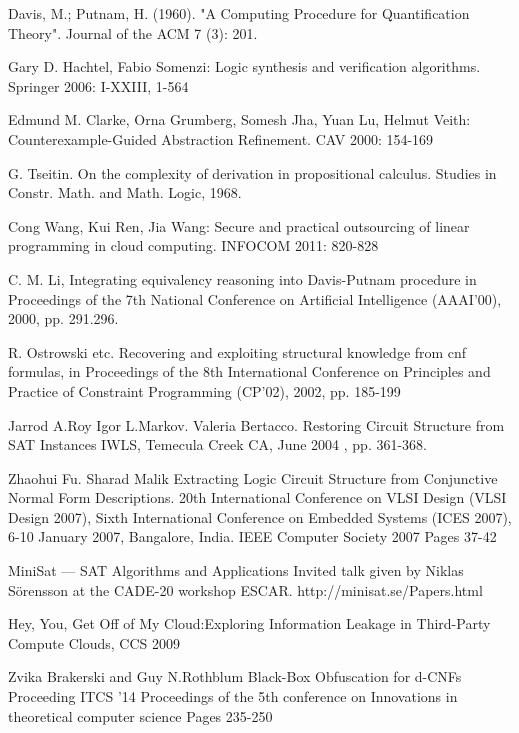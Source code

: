 \documentclass[runningheads,a4paper]{llncs}
\begin{document}
\begin{thebibliography}{4}

 Davis, M.; Putnam, H. (1960). "A Computing Procedure for Quantification Theory". Journal of the ACM 7 (3): 201.

 Gary D. Hachtel, Fabio Somenzi: Logic synthesis and verification algorithms. Springer 2006: I-XXIII, 1-564

 Edmund M. Clarke, Orna Grumberg, Somesh Jha, Yuan Lu, Helmut Veith: Counterexample-Guided Abstraction Refinement. CAV 2000: 154-169

 G. Tseitin. On the complexity of derivation in propositional calculus. Studies in Constr. Math. and Math. Logic, 1968.

 Cong Wang, Kui Ren, Jia Wang: Secure and practical outsourcing of linear programming in cloud computing. INFOCOM 2011: 820-828

 C. M. Li, Integrating equivalency reasoning into Davis-Putnam procedure in Proceedings of the 7th National Conference on Artificial Intelligence (AAAI'00), 2000, pp. 291.296.

\bibitem{} R. Ostrowski etc. Recovering and exploiting structural knowledge from cnf formulas, in Proceedings of the 8th International Conference on Principles and Practice of Constraint Programming (CP'02), 2002, pp. 185-199

\bibitem{} Jarrod A.Roy Igor L.Markov. Valeria Bertacco. Restoring Circuit Structure from SAT Instances IWLS, Temecula Creek CA, June 2004 , pp. 361-368.

\bibitem{} Zhaohui Fu. Sharad Malik Extracting Logic Circuit Structure from Conjunctive Normal Form Descriptions. 20th International Conference on VLSI Design (VLSI Design 2007), Sixth International Conference on Embedded Systems (ICES 2007), 6-10 January 2007, Bangalore, India. IEEE Computer Society 2007 Pages 37-42

\bibitem{} MiniSat — SAT Algorithms and Applications Invited talk given by Niklas Sörensson at the CADE-20 workshop ESCAR. http://minisat.se/Papers.html

\bibitem{} Hey, You, Get Off of My Cloud:Exploring Information Leakage in Third-Party Compute Clouds, CCS 2009

\bibitem{} Zvika Brakerski and Guy N.Rothblum Black-Box Obfuscation for d-CNFs  Proceeding ITCS '14 Proceedings of the 5th conference on Innovations in theoretical computer science Pages 235-250 


\end{thebibliography}
\end{document}
